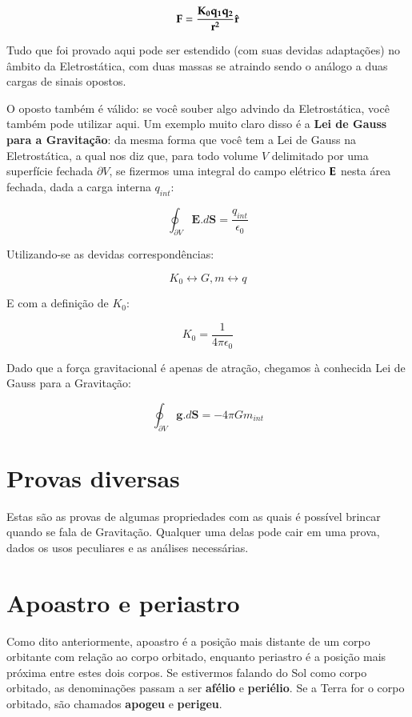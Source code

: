 \[
	\bf{F} = \frac{K_0 q_1 q_2}{r^2}\hat{\bf{r}}
\]

Tudo que foi provado aqui pode ser estendido (com suas devidas adaptações) no âmbito da Eletrostática, com duas massas se atraindo sendo o análogo a duas cargas de sinais opostos.{\\}

O oposto também é válido: se você souber algo advindo da Eletrostática, você também pode utilizar aqui. Um exemplo muito claro disso é a \textbf{Lei de Gauss para a Gravitação}: da mesma forma que você tem a Lei de Gauss na Eletrostática, a qual nos diz que, para todo volume $V$ delimitado por uma superfície fechada $\partial V$, se fizermos uma integral do campo elétrico $\bf{E}$ nesta área fechada, dada a carga interna $q_{int}$:

\[
	\oint_{\partial V} \mathbf{E}.d\mathbf{S} = \frac{q_{int}}{\epsilon_0}
\]

Utilizando-se as devidas correspondências:

\[
	K_0 \leftrightarrow G, m \leftrightarrow q
\]

E com a definição de $K_0$:

\[
	K_0 = \frac{1}{4 \pi \epsilon_0}
\]

Dado que a força gravitacional é apenas de atração, chegamos à conhecida Lei de Gauss para a Gravitação:

\begin{equation}
	\oint_{\partial V} \mathbf{g}.d\mathbf{S} = -4 \pi G m_{int}
	\label{eq65}
\end{equation}

\newpage

\section{Provas diversas}

Estas são as provas de algumas propriedades com as quais é possível brincar quando se fala de Gravitação. Qualquer uma delas pode cair em uma prova, dados os usos peculiares e as análises necessárias.

\section{Apoastro e periastro}

Como dito anteriormente, apoastro é a posição mais distante de um corpo orbitante com relação ao corpo orbitado, enquanto periastro é a posição mais próxima entre estes dois corpos. Se estivermos falando do Sol como corpo orbitado, as denominações passam a ser \textbf{afélio} e \textbf{periélio}. Se a Terra for o corpo orbitado, são chamados \textbf{apogeu} e \textbf{perigeu}.{\\}

